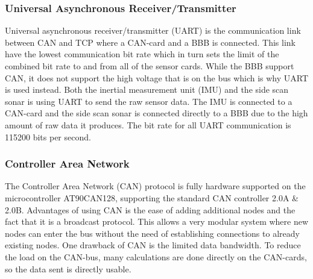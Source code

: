 \subsubsection{Universal Asynchronous Receiver/Transmitter} %
\noindent Universal asynchronous receiver/transmitter (UART) is the communication link between CAN and TCP where a CAN-card and a BBB is connected. This link have the lowest communication bit rate which in turn sets the limit of the combined bit rate to and from all of the sensor cards. While the BBB support CAN, it does not support the high voltage that is on the bus which is why UART is used instead. Both the inertial measurement unit (IMU) and the side scan sonar is using UART to send the raw sensor data. The IMU is connected to a CAN-card and the side scan sonar is connected directly to a BBB due to the high amount of raw data it produces. The bit rate for all UART communication is 115200 bits per second.

\subsubsection{Controller Area Network} %
\noindent The Controller Area Network (CAN) protocol is fully hardware supported on the microcontroller AT90CAN128, supporting the standard CAN controller 2.0A \& 2.0B. Advantages of using CAN is the ease of adding additional nodes and the fact that it is a broadcast protocol. This allows a very modular system where new nodes can enter the bus without the need of establishing connections to already existing nodes. One drawback of CAN is the limited data bandwidth. To reduce the load on the CAN-bus, many calculations are done directly on the CAN-cards, so the data sent is directly usable.
